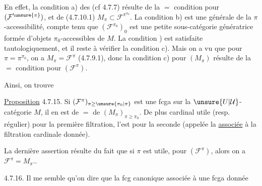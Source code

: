 En effet, la condition a) des  (cf 4.7.7) résulte de
la $=$ condition pour $(\mathcal F^{\unsure{\pi}})$, et de (4.7.10.1)
$M_\pi\subset\mathcal F^{\pi^{\pi_0}}$. La condition b) est une  
générale de la $\pi$-accessibilité, compte tenu
que $(\mathcal F^{\pi_0})_0$ est une petite sous-catégorie génératrice
formée d'objets $\pi_0$-accessibles de $M$. La condition ) est satisfaite tautologiquement, et
il reste à vérifier la condition c). Mais
on a vu que pour $\pi=\pi^{\pi_0}$, on a $M_\pi=\mathcal F^\pi$
(4.7.9.1), donc la condition c) pour $(M_\pi)$
résulte de la $=$ condition pour $(\mathcal F^\pi)$.

Ainsi, on trouve

\uline{Proposition} 4.7.15. Si $(\mathcal F^\pi)_{\pi\geq\unsure{\pi_0|\pi}}$ est une
fcga sur la $\unsure{U|\mathcal U}$-catégorie $M$, il en est
de $=$ de $(M_\pi)_{\pi\geq\pi_0}$. De plus 
cardinal utile (resp. régulier) pour la
première filtration, l'est pour la  seconde
(appelée la   \uline{associée}
à la filtration cardinale donnée).

La dernière assertion résulte du
fait que si $\pi$ est utile, pour $(\mathcal F^\pi)$, alors
on a $\mathcal F^\pi=M_\pi$..

4.7.16. Il me semble qu'on  dire que la
fcg canonique associée à une fcga donnée

